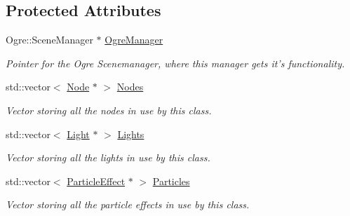 \subsection*{Protected Attributes}
\begin{DoxyCompactItemize}
\item 
\hypertarget{classphys_1_1SceneManager_ab9980c42506a8757cab12feb210f056a}{
Ogre::SceneManager $\ast$ \hyperlink{classphys_1_1SceneManager_ab9980c42506a8757cab12feb210f056a}{OgreManager}}
\label{dd/da8/classphys_1_1SceneManager_ab9980c42506a8757cab12feb210f056a}

\begin{DoxyCompactList}\small\item\em Pointer for the Ogre Scenemanager, where this manager gets it's functionality. \item\end{DoxyCompactList}\item 
\hypertarget{classphys_1_1SceneManager_aac556e9a9ee9c8c348259e86018d1df6}{
std::vector$<$ \hyperlink{classphys_1_1Node}{Node} $\ast$ $>$ \hyperlink{classphys_1_1SceneManager_aac556e9a9ee9c8c348259e86018d1df6}{Nodes}}
\label{dd/da8/classphys_1_1SceneManager_aac556e9a9ee9c8c348259e86018d1df6}

\begin{DoxyCompactList}\small\item\em Vector storing all the nodes in use by this class. \item\end{DoxyCompactList}\item 
\hypertarget{classphys_1_1SceneManager_a196c70361e8db0d5861cfb7b35f1bbf3}{
std::vector$<$ \hyperlink{classphys_1_1Light}{Light} $\ast$ $>$ \hyperlink{classphys_1_1SceneManager_a196c70361e8db0d5861cfb7b35f1bbf3}{Lights}}
\label{dd/da8/classphys_1_1SceneManager_a196c70361e8db0d5861cfb7b35f1bbf3}

\begin{DoxyCompactList}\small\item\em Vector storing all the lights in use by this class. \item\end{DoxyCompactList}\item 
\hypertarget{classphys_1_1SceneManager_a45f2d2029642d668c1e15a914eac7d1b}{
std::vector$<$ \hyperlink{classphys_1_1ParticleEffect}{ParticleEffect} $\ast$ $>$ \hyperlink{classphys_1_1SceneManager_a45f2d2029642d668c1e15a914eac7d1b}{Particles}}
\label{dd/da8/classphys_1_1SceneManager_a45f2d2029642d668c1e15a914eac7d1b}

\begin{DoxyCompactList}\small\item\em Vector storing all the particle effects in use by this class. \item\end{DoxyCompactList}\end{DoxyCompactItemize}


